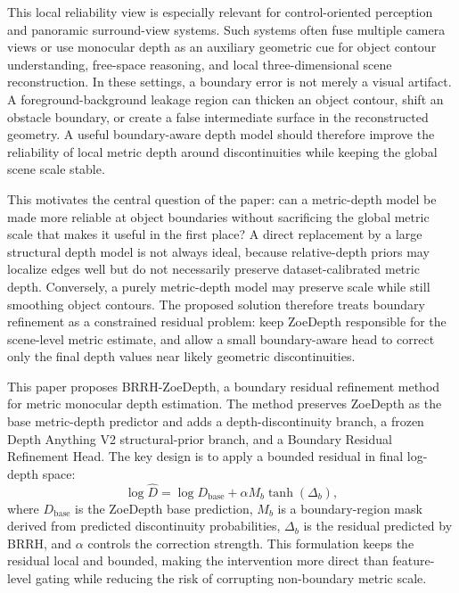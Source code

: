 \documentclass{ieeeaccess}
\begin{document}
This local reliability view is especially relevant for control-oriented perception and panoramic surround-view systems. Such systems often fuse multiple camera views or use monocular depth as an auxiliary geometric cue for object contour understanding, free-space reasoning, and local three-dimensional scene reconstruction. In these settings, a boundary error is not merely a visual artifact. A foreground-background leakage region can thicken an object contour, shift an obstacle boundary, or create a false intermediate surface in the reconstructed geometry. A useful boundary-aware depth model should therefore improve the reliability of local metric depth around discontinuities while keeping the global scene scale stable.

This motivates the central question of the paper: can a metric-depth model be made more reliable at object boundaries without sacrificing the global metric scale that makes it useful in the first place? A direct replacement by a large structural depth model is not always ideal, because relative-depth priors may localize edges well but do not necessarily preserve dataset-calibrated metric depth. Conversely, a purely metric-depth model may preserve scale while still smoothing object contours. The proposed solution therefore treats boundary refinement as a constrained residual problem: keep ZoeDepth responsible for the scene-level metric estimate, and allow a small boundary-aware head to correct only the final depth values near likely geometric discontinuities.

This paper proposes BRRH-ZoeDepth, a boundary residual refinement method for metric monocular depth estimation. The method preserves ZoeDepth as the base metric-depth predictor and adds a depth-discontinuity branch, a frozen Depth Anything V2 structural-prior branch, and a Boundary Residual Refinement Head. The key design is to apply a bounded residual in final log-depth space:
\begin{equation}
\log \hat{D} = \log D_{\mathrm{base}} + \alpha M_b \tanh(\Delta_b),
\label{eq:intro_residual}
\end{equation}
where $D_{\mathrm{base}}$ is the ZoeDepth base prediction, $M_b$ is a boundary-region mask derived from predicted discontinuity probabilities, $\Delta_b$ is the residual predicted by BRRH, and $\alpha$ controls the correction strength. This formulation keeps the residual local and bounded, making the intervention more direct than feature-level gating while reducing the risk of corrupting non-boundary metric scale.
\end{document}
